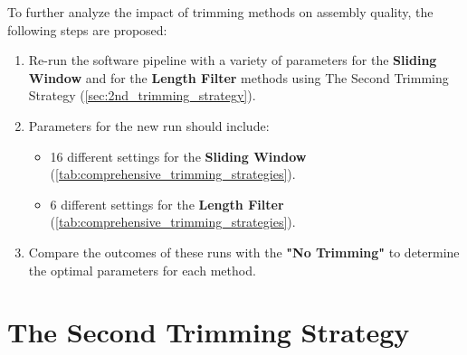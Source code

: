 To further analyze the impact of \gls{trimming} methods on \gls{assembly} quality, the following steps are proposed:
\begin{enumerate}
  \item Re-run the software pipeline with a variety of parameters for the \textbf{Sliding Window} and for the \textbf{Length Filter} methods using The Second Trimming Strategy (\autoref{sec:2nd_trimming_strategy}).
  \item Parameters for the new run should include:
    \begin{itemize}
      \item 16 different settings for the \textbf{Sliding Window} (\autoref{tab:comprehensive_trimming_strategies}).
      \item 6 different settings for the \textbf{Length Filter} (\autoref{tab:comprehensive_trimming_strategies}).
    \end{itemize}
  \item Compare the outcomes of these runs with the \textbf{"No Trimming"} to determine the optimal parameters for each method.
\end{enumerate}






\section{The Second Trimming Strategy } \label{sec:2nd_trimming_strategy}



